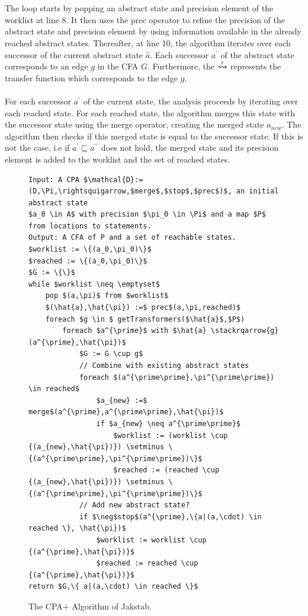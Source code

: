 \documentclass{kththesis}
\newcommand\stackrqarrow[1]{%
    \mathrel{\stackon[2pt]{$\rightsquigarrow$}{$\scriptscriptstyle#1$}}}
\begin{document}
\\ \\
The loop starts by popping an abstract state and precision element of the worklist at line 8. It then uses the prec operator to refine the precision of the abstract state and precision element by using information available in the already reached abstract states. Thereafter, at line 10, the algorithm iterates over each successor of the current abstract state $\hat{a}$. Each successor $a^{\prime}$ of the abstract state corresponds to an edge $g$ in the CFA $G$. Furthermore, the $\stackrqarrow{g}$ represents the transfer function which corresponds to the edge $g$.
\\ \\
For each successor $a^{\prime}$ of the current state, the analysis proceeds by iterating over each reached state. For each reached state, the algorithm merges this state with the successor state using the merge operator, creating the merged state $a_{new}$. The algorithm then checks if this merged state is equal to the successor state. If this is not the case, i.e if $a^{\prime} \sqsubseteq a^{\prime\prime}$ does not hold, the merged state and its precision element is added to the worklist and the set of reached states.
\begin{figure}[!htb]
\begin{minipage}{\textwidth}
    \centering
\begin{algorithmFrame}
\begin{lstlisting}[style=algorithm]
Input: A CPA $\mathcal{D}:=(D,\Pi,\rightsquigarrow,$merge$,$stop$,$prec$)$, an initial abstract state
$a_0 \in A$ with precision $\pi_0 \in \Pi$ and a map $P$ from locations to statements.
Output: A CFA of P and a set of reachable states.
$worklist := \{(a_0,\pi_0)\}$
$reached := \{(a_0,\pi_0)\}$
$G := \{\}$
while $worklist \neq \emptyset$
    pop $(a,\pi)$ from $worklist$
    $(\hat{a},\hat{\pi}) :=$ prec$(a,\pi,reached)$
    foreach $g \in $ getTransformers($\hat{a}$,$P$)
        foreach $a^{\prime}$ with $\hat{a} \stackrqarrow{g} (a^{\prime},\hat{\pi})$
            $G := G \cup g$
            // Combine with existing abstract states
            foreach $(a^{\prime\prime},\pi^{\prime\prime}) \in reached$
                $a_{new} :=$ merge$(a^{\prime},a^{\prime\prime},\hat{\pi})$
                if $a_{new} \neq a^{\prime\prime}$
                    $worklist := (worklist \cup {(a_{new},\hat{\pi})}) \setminus \{(a^{\prime\prime},\pi^{\prime\prime})\}$
                    $reached := (reached \cup {(a_{new},\hat{\pi})}) \setminus \{(a^{\prime\prime},\pi^{\prime\prime})\}$
            // Add new abstract state?
            if $\neg$stop$(a^{\prime},\{a|(a,\cdot) \in reached \}, \hat{\pi})$
                $worklist := worklist \cup {(a^{\prime},\hat{\pi})}$
                $reached := reached \cup {(a^{\prime},\hat{\pi})}$
return $G,\{ a|(a,\cdot) \in reached \}$
\end{lstlisting}
\end{algorithmFrame}
\caption[The CPA+ Algorithm of Jakstab.]{The CPA+ Algorithm of Jakstab\footnotemark.}
\label{fig:CPAJakstab}
\end{minipage}
\end{figure}
\end{document}
